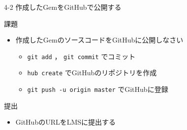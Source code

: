 \documentclass[t, aspectratio=169]{beamer}
\begin{document}
\begin{frame}[fragile,label=sec-4-4-2]{4-2 作成したGemをGitHubで公開する}
 \begin{block}{課題}
\begin{itemize}
\item 作成したGemのソースコードをGitHubに公開しなさい
\begin{itemize}
\item \texttt{git add} ， \texttt{git commit} でコミット
\item \texttt{hub create} でGitHubのリポジトリを作成
\item \texttt{git push -u origin master} でGitHubに登録
\end{itemize}
\end{itemize}
\end{block}

\begin{block}{提出}
\begin{itemize}
\item GitHubのURLをLMSに提出する
\end{itemize}
\end{block}
\end{frame}
\end{document}
